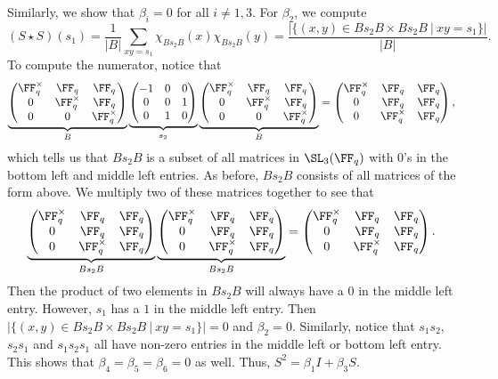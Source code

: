 \documentclass[11pt]{amsart}
\theoremstyle{remark}
\begin{document}
Similarly, we show that $\beta_i=0$ for all $i\neq 1,3$.
For $\beta_2$, we compute
\[
	(S\star S)(s_1) = \frac{1}{|B|}\sum_{xy=s_1} \chi_{Bs_2B}(x)\chi_{Bs_2B}(y) = \frac{|\{(x,y)\in Bs_2B\times Bs_2B\ |\ xy=s_1\}|}{|B|}.
\]
To compute the numerator, notice that
\[
	\underbrace{\begin{pmatrix}
			\FF_q^\times & \FF_q        & \FF_q        \\
			0            & \FF_q^\times & \FF_q        \\
			0            & 0            & \FF_q^\times
		\end{pmatrix}}_{B}
	\underbrace{\begin{pmatrix}
			-1 & 0 & 0 \\ 0 & 0 & 1 \\ 0 & 1 & 0
		\end{pmatrix}}_{s_2}
	\underbrace{\begin{pmatrix}
			\FF_q^\times & \FF_q        & \FF_q        \\
			0            & \FF_q^\times & \FF_q        \\
			0            & 0            & \FF_q^\times
		\end{pmatrix}}_{B} =
	\begin{pmatrix}
		\FF_q^\times & \FF_q        & \FF_q \\
		0            & \FF_q        & \FF_q \\
		0            & \FF_q^\times & \FF_q
	\end{pmatrix},
\]
which tells us that $Bs_2B$ is a subset of all matrices in $\SL_3(\FF_q)$ with $0$'s in the bottom left and middle left entries.
As before, $Bs_2B$ consists of all matrices of the form above.
We multiply two of these matrices together to see that
\[
	\underbrace{\begin{pmatrix}
			\FF_q^\times & \FF_q        & \FF_q \\
			0            & \FF_q        & \FF_q \\
			0            & \FF_q^\times & \FF_q
		\end{pmatrix}}_{Bs_2B}
	\underbrace{\begin{pmatrix}
			\FF_q^\times & \FF_q        & \FF_q \\
			0            & \FF_q        & \FF_q \\
			0            & \FF_q^\times & \FF_q
		\end{pmatrix}}_{Bs_2B}  =
	\begin{pmatrix}
		\FF_q^\times & \FF_q        & \FF_q \\
		0            & \FF_q        & \FF_q \\
		0            & \FF_q^\times & \FF_q
	\end{pmatrix}.
\]
Then the product of two elements in $Bs_2B$ will always have a $0$ in the middle left entry.
However, $s_1$ has a $1$ in the middle left entry.
Then $|\{(x,y)\in Bs_2B\times Bs_2B\ |\ xy=s_1\}| = 0$ and $\beta_2=0$.
Similarly, notice that $s_1s_2$, $s_2s_1$ and $s_1s_2s_1$ all have non-zero entries in the middle left or bottom left entry.
This shows that $\beta_4=\beta_5=\beta_6=0$ as well.
Thus, $S^2 = \beta_1 I + \beta_3 S$.
\end{document}
